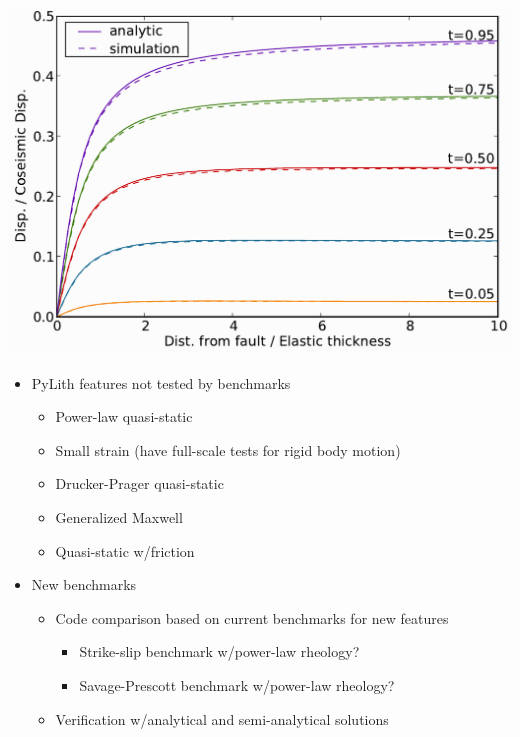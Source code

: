 \documentclass[pdftex,cig,slideColor]{pp4slides}
\begin{document}
  \vfill
  \begin{center}
    \includegraphics[scale=0.8]{figs/savageprescott_profile9}
  \end{center}
  \vfill



  \begin{itemize}
  \item PyLith features not tested by benchmarks
    \begin{itemize}
    \item Power-law quasi-static
    \item Small strain (have full-scale tests for rigid body motion)
    \item Drucker-Prager quasi-static
    \item Generalized Maxwell
    \item Quasi-static w/friction
    \end{itemize}
  \item New benchmarks
    \begin{itemize}
    \item Code comparison based on current benchmarks for new features
      \begin{itemize}
      \item Strike-slip benchmark w/power-law rheology?
      \item Savage-Prescott benchmark w/power-law rheology?
      \end{itemize}
    \item Verification w/analytical and semi-analytical solutions
    \end{itemize}
 \end{itemize}
  

\end{document}

